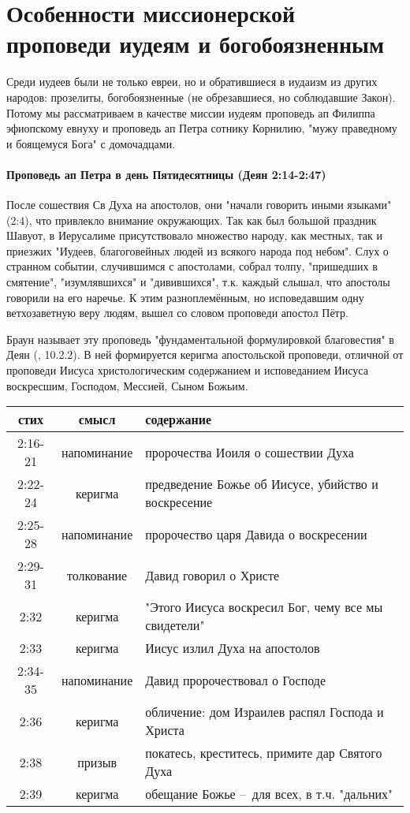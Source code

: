 
\chapter{ Особенности миссионерской проповеди иудеям и богобоязненным}
\label{cha:judes}
%
%
Среди иудеев были не только евреи, но и обратившиеся в иудаизм из других народов: прозелиты, богобоязненные (не обрезавшиеся, но соблюдавшие Закон). Потому мы рассматриваем в качестве миссии иудеям проповедь ап Филиппа эфиопскому евнуху и проповедь ап Петра сотнику Корнилию, "мужу праведному и боящемуся Бога" с домочадцами.

\subsubsection*{Проповедь ап Петра в день Пятидесятницы (Деян 2:14-2:47)}
После сошествия Св Духа на апостолов, они "начали говорить иными языками" (2:4), что привлекло внимание окружающих.
Так как был большой праздник Шавуот, в Иерусалиме присутствовало множество народу, как местных, так и приезжих "Иудеев, благоговейных людей из всякого народа под небом".
Слух о странном событии, случившимся с апостолами, собрал толпу, "пришедших в смятение", "изумлявшихся" и "дивившихся", т.к. каждый слышал, что апостолы говорили на его наречье.
К этим разноплемённым, но исповедавшим одну ветхозаветную веру людям, вышел со словом проповеди апостол Пётр.

Браун называет эту проповедь "фундаментальной формулировкой благовестия" в Деян (\cite{@brown.vvedenie_1}, 10.2.2).
В ней формируется керигма апостольской проповеди, отличной от проповеди Иисуса христологическим содержанием и исповеданием Иисуса воскресшим, Господом, Мессией, Сыном Божьим. 

\begin{center}
	\begin{longtable}{ |c|c|p{}| } 
 \hline
 стих & смысл & содержание \\ 
 \hline\hline
 2:16-21 & напоминание & пророчества Иоиля о сошествии Духа \\ 
 2:22-24 & керигма & предведение Божье об Иисусе, убийство и воскресение \\ 
 2:25-28 & напоминание & пророчество царя Давида о воскресении \\
 2:29-31 & толкование & Давид говорил о Христе \\
 2:32 & керигма & "Этого Иисуса воскресил Бог, чему все мы свидетели" \\
 2:33 & керигма & Иисус излил Духа на апостолов \\
 2:34-35 & напоминание & Давид пророчествовал о Господе \\
 2:36 & керигма & обличение: дом Израилев распял Господа и Христа \\
 2:38 & призыв & покатесь, креститесь, примите дар Святого Духа \\
 2:39 & керигма & обещание Божье – для всех, в т.ч. "дальних" \\ 
 \hline
\end{longtable}
\end{center}



